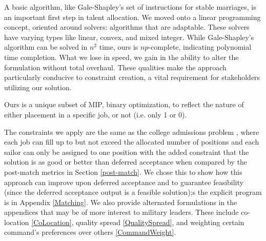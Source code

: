 A basic algorithm, like Gale-Shapley’s set of instructions for stable marriages, is an important first step in talent allocation. We moved onto a linear programming concept, oriented around solvers:  algorithms that are adaptable. These solvers have varying types like linear, convex, and mixed integer. While Gale-Shapley’s algorithm can be solved in $n^2$ time, ours is $np$-complete, indicating polynomial time completion. What we lose in speed, we gain in the ability to alter the formulation  without total overhaul. These qualities make the approach particularly conducive to constraint creation, a vital requirement for stakeholders utilizing our solution.

Ours is a unique subset of MIP, binary optimization, to reflect the nature of either placement in a specific job, or not (i.e. only 1 or 0). 


The constraints we apply are the same as the college admissions problem \cite{1985_Roth}, where each job can fill up to but not exceed the allocated number of positions and each sailor can only be assigned to one position with the added constraint that the solution is as good or better than deferred acceptance when compared by the post-match metrics in Section \ref{post-match}. We chose this to show how this approach can improve upon deferred acceptance and to guarantee feasibility (since the deferred acceptance output is a feasible solution);s the explicit program is in Appendix \ref{Matching}. We also provide alternated formulations in the appendices that may be of more interest to military leaders. These include co-location \ref{CoLocation}, quality spread \ref{QualitySpread}, and weighting certain command's preferences over others \ref{CommandWeight}.


